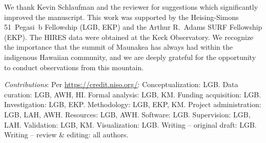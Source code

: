 \documentclass[11pt,twocolumn,tighten]{aastex63}
\begin{document}
\acknowledgements
We thank Kevin Schlaufman and the reviewer for suggestions which significantly improved the 
manuscript.
This work was supported by the Heising-Simons 51~Pegasi~b Fellowship
(LGB, EKP) and the Arthur R.~Adams SURF Fellowship (EKP).
The HIRES data were obtained at the Keck Observatory.
We recognize the importance that the summit of Maunakea has always had
within the indigenous Hawaiian community, and we are deeply grateful 
for the opportunity to conduct observations from this mountain.



{\it \large Contributions}: Per \url{https://credit.niso.org/}:
Conceptualization: LGB.
Data curation: LGB, AWH, HI.
Formal analysis: LGB, KM.
Funding acquisition: LGB.
Investigation: LGB, EKP.
Methodology: LGB, EKP, KM.
Project administration: LGB, LAH, AWH.
Resources: LGB, AWH.
Software: LGB.
Supervision: LGB, LAH.
Validation: LGB, KM.
Visualization: LGB.
Writing – original draft: LGB.
Writing – review \& editing: all authors.




\clearpage 
\end{document}
